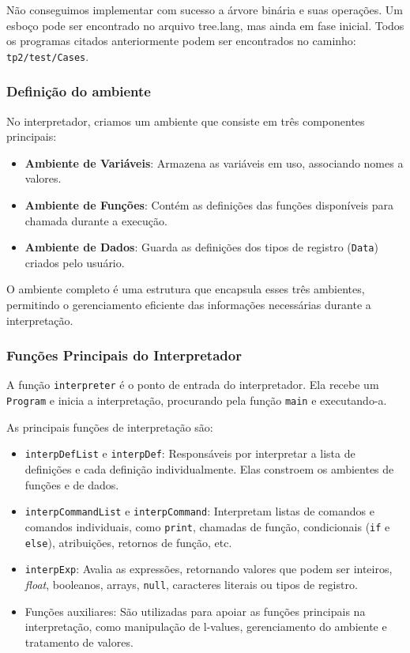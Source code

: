 \documentclass{article}
\begin{document}
Não conseguimos implementar com sucesso a árvore binária e suas operações. Um esboço pode ser encontrado no arquivo tree.lang, mas ainda em fase inicial. Todos os programas citados anteriormente podem ser encontrados no caminho: \texttt{tp2/test/Cases}.

\subsubsection{Definição do ambiente}

No interpretador, criamos um ambiente que consiste em três componentes principais:

\begin{itemize}
    \item \textbf{Ambiente de Variáveis}: Armazena as variáveis em uso, associando nomes a valores.
    \item \textbf{Ambiente de Funções}: Contém as definições das funções disponíveis para chamada durante a execução.
    \item \textbf{Ambiente de Dados}: Guarda as definições dos tipos de registro (\texttt{Data}) criados pelo usuário.
\end{itemize}

O ambiente completo é uma estrutura que encapsula esses três ambientes, permitindo o gerenciamento eficiente das informações necessárias durante a interpretação.

\subsubsection{Funções Principais do Interpretador}

A função \texttt{interpreter} é o ponto de entrada do interpretador. Ela recebe um \texttt{Program} e inicia a interpretação, procurando pela função \texttt{main} e executando-a.

As principais funções de interpretação são:

\begin{itemize}
    \item \texttt{interpDefList} e \texttt{interpDef}: Responsáveis por interpretar a lista de definições e cada definição individualmente. Elas constroem os ambientes de funções e de dados.
    \item \texttt{interpCommandList} e \texttt{interpCommand}: Interpretam listas de comandos e comandos individuais, como \texttt{print}, chamadas de função, condicionais (\texttt{if} e \texttt{else}), atribuições, retornos de função, etc.
    \item \texttt{interpExp}: Avalia as expressões, retornando valores que podem ser inteiros, \textit{float}, booleanos, arrays, \texttt{null}, caracteres literais ou tipos de registro.
    \item Funções auxiliares: São utilizadas para apoiar as funções principais na interpretação, como manipulação de l-values, gerenciamento do ambiente e tratamento de valores.
\end{itemize}
\end{document}
